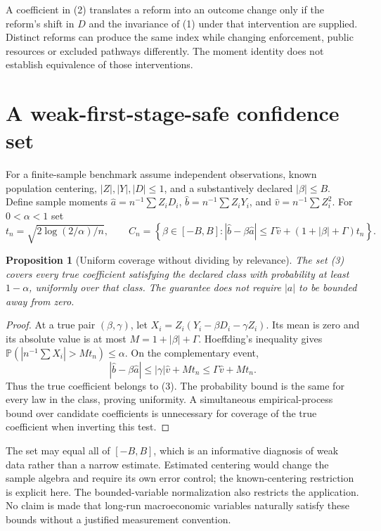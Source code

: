 \documentclass[11pt,a4paper]{article}
\newtheorem{proposition}[theorem]{Proposition}
\newcommand{\Prb}{\mathbb P}
\begin{document}
A coefficient in (2) translates a reform into an outcome change only if the reform's shift in $D$ and the invariance of (1) under that intervention are supplied. Distinct reforms can produce the same index while changing enforcement, public resources or excluded pathways differently. The moment identity does not establish equivalence of those interventions.

\section{A weak-first-stage-safe confidence set}
For a finite-sample benchmark assume independent observations, known population centering, $|Z|,|Y|,|D|\le1$, and a substantively declared $|\beta|\le B$. Define sample moments $\widehat a=n^{-1}\sum Z_iD_i$, $\widehat b=n^{-1}\sum Z_iY_i$, and $\widehat v=n^{-1}\sum Z_i^2$. For $0<\alpha<1$ set
\[
 t_n=\sqrt{2\log(2/\alpha)/n},\qquad
 C_n=\left\{\beta\in[-B,B]:
 |\widehat b-\beta\widehat a|\le
 \Gamma\widehat v+(1+|\beta|+\Gamma)t_n\right\}. \tag{3}
\]
\begin{proposition}[Uniform coverage without dividing by relevance]
The set (3) covers every true coefficient satisfying the declared class with probability at least $1-\alpha$, uniformly over that class. The guarantee does not require $|a|$ to be bounded away from zero.
\end{proposition}
\begin{proof}
At a true pair $(\beta,\gamma)$, let $X_i=Z_i(Y_i-\beta D_i-\gamma Z_i)$. Its mean is zero and its absolute value is at most $M=1+|\beta|+\Gamma$. Hoeffding's inequality gives $\Prb(|n^{-1}\sum X_i|>Mt_n)\le\alpha$. On the complementary event,
\[
 |\widehat b-\beta\widehat a|
 \le |\gamma|\widehat v+Mt_n\le\Gamma\widehat v+Mt_n.
\]
Thus the true coefficient belongs to (3). The probability bound is the same for every law in the class, proving uniformity. A simultaneous empirical-process bound over candidate coefficients is unnecessary for coverage of the true coefficient when inverting this test.
\end{proof}

The set may equal all of $[-B,B]$, which is an informative diagnosis of weak data rather than a narrow estimate. Estimated centering would change the sample algebra and require its own error control; the known-centering restriction is explicit here. The bounded-variable normalization also restricts the application. No claim is made that long-run macroeconomic variables naturally satisfy these bounds without a justified measurement convention.
\end{document}
